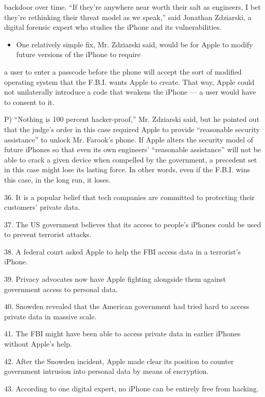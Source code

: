 \documentclass[UTF8,11pt]{ctexart}
\begin{document}
backdoor over time. “If they’re anywhere near worth their salt as engineers, I bet they’re rethinking their threat model as we speak,” said Jonathan Zdziarski, a digital forensic expert who studies the iPhone and its vulnerabilities.


\begin{itemize}[leftmargin=2em,itemsep=.2em,topsep=.4em]\item[O.] One relatively simple fix, Mr. Zdziarski said, would be for Apple to modify future versions of the iPhone to require
\end{itemize}

a user to enter a passcode before the phone will accept the sort of modified operating system that the F.B.I. wants Apple to create. That way, Apple could not unilaterally introduce a code that weakens the iPhone — a user would have to consent to it.


P) “Nothing is 100 percent hacker-proof,” Mr. Zdziarski said, but he pointed out that the judge’s order in this case required Apple to provide “reasonable security assistance” to unlock Mr. Farook’s phone. If Apple alters the security model of future iPhones so that even its own engineers’ “reasonable assistance” will not be able to crack a given device when compelled by the government, a precedent set in this case might lose its lasting force. In other words, even if the F.B.I. wins this case, in the long run, it loses.


36. It is a popular belief that tech companies are committed to protecting their customers’ private data.


37. The US government believes that its access to people’s iPhones could be used to prevent terrorist attacks.


38. A federal court asked Apple to help the FBI access data in a terrorist’s iPhone.


39. Privacy advocates now have Apple fighting alongside them against government access to personal data.


40. Snowden revealed that the American government had tried hard to access private data in massive scale.


41. The FBI might have been able to access private data in earlier iPhones without Apple’s help.


42. After the Snowden incident, Apple made clear its position to counter government intrusion into personal data by means of encryption.


43. According to one digital expert, no iPhone can be entirely free from hacking.
\end{document}
